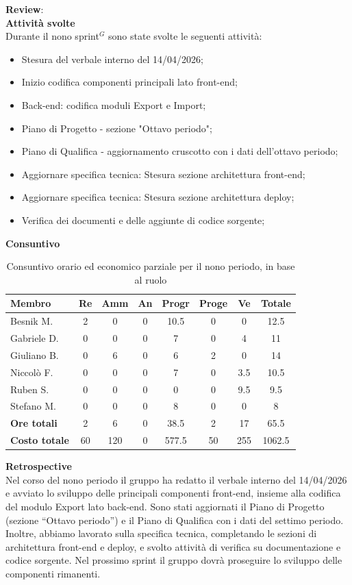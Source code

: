 \documentclass[a4paper,10pt]{article}
\begin{document}
\textbf{Review}: \\
\textbf{Attività svolte}\\
Durante il nono sprint$^G$ sono state svolte le seguenti attività:
\begin{itemize}
    \item Stesura del verbale interno del 14/04/2026;
  \item Inizio codifica componenti principali lato front-end;
  \item Back-end: codifica moduli Export e Import;
  \item Piano di Progetto - sezione "Ottavo periodo";
  \item Piano di Qualifica - aggiornamento cruscotto con i dati dell'ottavo periodo;
  \item Aggiornare specifica tecnica: Stesura sezione architettura front-end;
  \item Aggiornare specifica tecnica: Stesura sezione architettura deploy;
  \item Verifica dei documenti e delle aggiunte di codice sorgente;
\end{itemize}
\textbf{Consuntivo}
\begin{table}[H]
\centering
\begin{tabular}{|l|c|c|c|c|c|c|c|}
\hline
\textbf{Membro} & \textbf{Re} & \textbf{Amm} & \textbf{An} & \textbf{Progr} & \textbf{Proge} & \textbf{Ve} & \textbf{Totale} \\
\hline
Besnik M.   & 2   & 0   & 0 & 10.5   & 0 & 0 & 12.5 \\
Gabriele D. & 0   & 0 & 0 & 7   & 0 & 4  & 11 \\
Giuliano B. & 0   & 6   & 0 & 6   & 2 & 0  & 14 \\
Niccolò F.  & 0   & 0   & 0 & 7   & 0 & 3.5  & 10.5 \\
Ruben S.    & 0 & 0   & 0 & 0   & 0 & 9.5  & 9.5 \\
Stefano M.  & 0   & 0   & 0 & 8 & 0 & 0  & 8 \\
\hline
\textbf{Ore totali} & 2  & 6 & 0 & 38.5  & 2  & 17 & 65.5 \\
\hline
\textbf{Costo totale} & 60  & 120 &0 & 577.5  & 50  & 255 & 1062.5 \\
\hline
\end{tabular}
\caption{Consuntivo orario ed economico parziale per il nono periodo, in base al ruolo}
\end{table}

\textbf{Retrospective} \\
Nel corso del nono periodo il gruppo ha redatto il verbale interno del 14/04/2026 e avviato lo sviluppo delle principali componenti front-end, insieme alla codifica del modulo Export lato back-end. Sono stati aggiornati il Piano di Progetto (sezione “Ottavo periodo”) e il Piano di Qualifica con i dati del settimo periodo. Inoltre, abbiamo lavorato sulla specifica tecnica, completando le sezioni di architettura front-end e deploy, e svolto attività di verifica su documentazione e codice sorgente.
Nel prossimo sprint il gruppo dovrà proseguire lo sviluppo delle componenti rimanenti.
\end{document}
